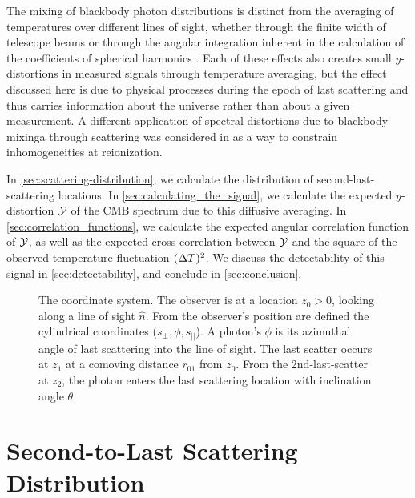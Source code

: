 \documentclass[fleqn,usenatbib]{mnras}
\begin{document}
    The mixing of blackbody photon distributions is distinct from the averaging
    of temperatures over different lines of sight, whether through the finite
    width of telescope beams \cite[e.g.][]{ChlubaSunyaev2004} or through the
    angular integration inherent in the calculation of the coefficients of
    spherical harmonics \cite[e.g.][]{Chluba+2017,Lucca+2020}.  Each of these
    effects also creates small $y$-distortions in measured signals through
    temperature averaging, but the effect discussed here is due to physical
    processes during the epoch of last scattering and thus carries information
    about the universe rather than about a given measurement.  A different
    application of spectral distortions due to blackbody mixinga through
    scattering  was considered in \cite{CaldwellStebbins2008} as a way to
    constrain inhomogeneities at reionization.

    In \autoref{sec:scattering-distribution}, we calculate the distribution of
    second-last-scattering locations.  In \autoref{sec:calculating_the_signal},
    we calculate the expected $y$-distortion $\mathcal{Y}$ of the CMB spectrum due to
    this diffusive averaging.  In \autoref{sec:correlation_functions}, we
    calculate the expected angular correlation function of $\mathcal{Y}$, as well as the
    expected cross-correlation between $\mathcal{Y}$ and the square of the observed
    temperature fluctuation $({\Delta T})^2$.  We discuss the detectability of this
    signal in \autoref{sec:detectability}, and conclude in
    \autoref{sec:conclusion}.

    \begin{figure*}
        
        \caption{%
            The coordinate system. The observer is at a location $z_0 > 0$,
            looking along a line of sight $\hat{n}$. From the observer's
            position are defined the cylindrical coordinates ($s_{\perp}, \phi,
            s_{||}$). A photon's $\phi$ is its azimuthal angle of last
            scattering into the line of sight. The last scatter occurs at $z_1$
            at a comoving distance $r_{01}$ from $z_0$. From the
            2nd-last-scatter at $z_2$, the photon enters the last scattering
            location with inclination angle $\theta$.
        }
        \label{fig:coordinate_system}
    \end{figure*}



\section{Second-to-Last Scattering Distribution}
\label{sec:scattering-distribution}
\end{document}
